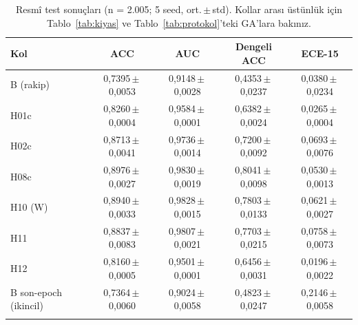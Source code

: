 \begin{table}[!htbp]
\centering\small
\setlength{\tabcolsep}{4pt}
\caption{Resmî test sonuçları (n = 2.005; 5 seed, ort.\,$\pm$\,std). Kollar arası üstünlük için Tablo~\ref{tab:kiyas} ve Tablo~\ref{tab:protokol}'teki GA'lara bakınız.}\label{tab:ana}
\begin{tabularx}{\textwidth}{>{\raggedright\arraybackslash}X cccc}
\toprule
Kol & ACC & AUC & Dengeli ACC & ECE-15 \\
\midrule
B (rakip) & 0,7395\,$\pm$\,0,0053 & 0,9148\,$\pm$\,0,0028 & 0,4353\,$\pm$\,0,0237 & 0,0380\,$\pm$\,0,0234 \\
H01c & 0,8260\,$\pm$\,0,0004 & 0,9584\,$\pm$\,0,0001 & 0,6382\,$\pm$\,0,0024 & 0,0265\,$\pm$\,0,0004 \\
H02c & 0,8713\,$\pm$\,0,0041 & 0,9736\,$\pm$\,0,0014 & 0,7200\,$\pm$\,0,0092 & 0,0693\,$\pm$\,0,0076 \\
H08c & 0,8976\,$\pm$\,0,0027 & 0,9830\,$\pm$\,0,0019 & 0,8041\,$\pm$\,0,0098 & 0,0530\,$\pm$\,0,0013 \\
H10 (W) & 0,8940\,$\pm$\,0,0033 & 0,9828\,$\pm$\,0,0015 & 0,7803\,$\pm$\,0,0133 & 0,0621\,$\pm$\,0,0027 \\
H11 & 0,8837\,$\pm$\,0,0083 & 0,9807\,$\pm$\,0,0021 & 0,7703\,$\pm$\,0,0215 & 0,0758\,$\pm$\,0,0073 \\
H12 & 0,8160\,$\pm$\,0,0005 & 0,9501\,$\pm$\,0,0001 & 0,6456\,$\pm$\,0,0031 & 0,0196\,$\pm$\,0,0022 \\
\midrule
B son-epoch (ikincil) & 0,7364\,$\pm$\,0,0060 & 0,9024\,$\pm$\,0,0058 & 0,4823\,$\pm$\,0,0247 & 0,2146\,$\pm$\,0,0058 \\
\botrule
\end{tabularx}
\end{table}
